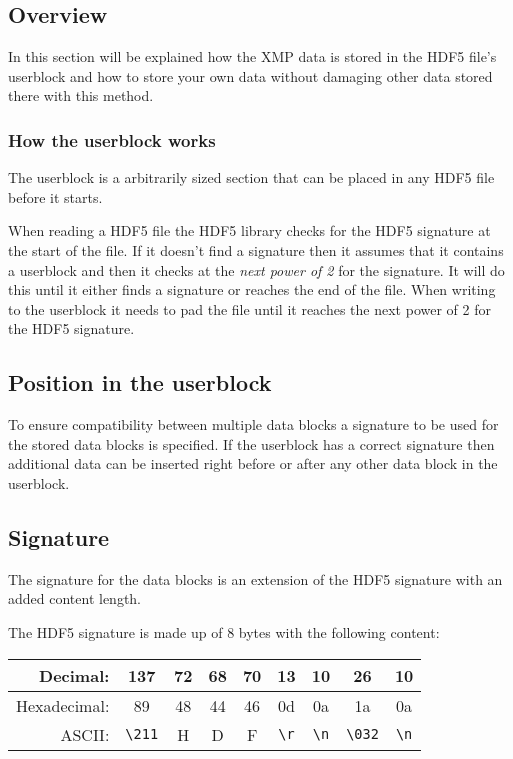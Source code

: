 \subsection{Overview}
In this section will be explained how the XMP data is stored in the HDF5 file's userblock
and how to store your own data without damaging other data stored there with this method.

\subsubsection{How the userblock works}
The userblock is a arbitrarily sized section that can be placed in any HDF5 file before it starts.

When reading a HDF5 file the HDF5 library checks for the HDF5 signature at the start of the file.
If it doesn't find a signature then it assumes that it contains a userblock and then it checks at the
\emph{next power of 2} for the signature.
It will do this until it either finds a signature or reaches the end of the file.
When writing to the userblock it needs to pad the file until it reaches the next power of 2 for the HDF5 signature.


\subsection{Position in the userblock}
To ensure compatibility between multiple data blocks a signature
to be used for the stored data blocks is specified.
If the userblock has a correct signature then additional data can be inserted right before
or after any other data block in the userblock.

\subsection{Signature}
The signature for the data blocks is an extension of the HDF5 signature with an added content length.

The HDF5 signature is made up of 8 bytes with the following content:

\begin{tabular}{ |r|c|c|c|c|c|c|c|c| }
    \hline
    Decimal:     & 137         & 72 & 68 & 70 & 13        & 10        & 26          & 10 \\ 
    \hline
    Hexadecimal: & 89          & 48 & 44 & 46 & 0d        & 0a        & 1a          & 0a \\ 
    \hline
    ASCII:       & \verb+\211+ & H  & D  & F  & \verb+\r+ & \verb+\n+ & \verb+\032+ & \verb+\n+ \\ 
    \hline
\end{tabular}

